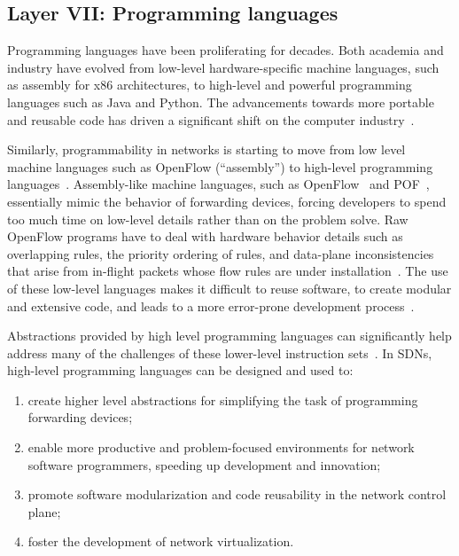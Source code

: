\subsection{Layer VII: Programming languages}
\label{sec:programminglanguages}

Programming languages have been proliferating for decades. Both academia and industry have evolved 
from low-level hardware-specific machine languages, such as assembly for x86 architectures, to high-level 
and powerful programming languages such as Java and Python. The advancements towards more portable and 
reusable code has driven a significant shift on the computer industry~\cite{guzdial2008,farooq2014}.

Similarly, programmability in networks is starting to move from low level machine languages such as OpenFlow (``assembly'') to high-level programming languages~\cite{foster2011,hinrichs2009,voellmy2011-1,monsanto2012,voellmy2012,monsanto2013,koponen}.
Assembly-like machine languages, such as OpenFlow~\cite{mckeown2008} and POF~\cite{song2013,song2013-1}, essentially mimic the behavior of forwarding devices, forcing developers to spend too much time on low-level details
rather than on the problem solve.
Raw OpenFlow programs have to deal with hardware behavior details such as overlapping rules, the priority ordering of rules, and data-plane inconsistencies that arise from in-flight packets whose flow rules are under installation~\cite{foster2011,monsanto2012,ferguson2012}.
The use of these low-level languages makes it difficult to reuse software, to create modular and extensive code, and leads to a more error-prone development process~\cite{monsanto2013,nelson2014,katta2012}.

Abstractions provided by high level programming languages can significantly help address many 
of the challenges of these lower-level instruction sets~\cite{foster2011,hinrichs2009,voellmy2011-1,monsanto2012,voellmy2012,monsanto2013}.
In SDNs, high-level programming languages can be designed and used to:
\begin{enumerate}
\item create higher level abstractions for simplifying the task of programming forwarding devices;
\item enable more productive and problem-focused environments for network software programmers, speeding up development and innovation;
\item promote software modularization and code reusability in the network control plane;
\item foster the development of network virtualization.
\end{enumerate}

